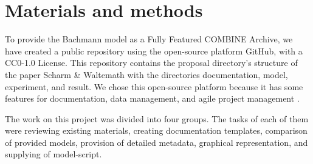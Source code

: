 \section*{Materials and methods}
To provide the Bachmann model \cite{bachmannmodel} as a Fully Featured COMBINE Archive, we have created a public repository using the open-source platform GitHub, with a CC0-1.0 License. This repository contains the proposal directory's structure of the paper Scharm \& Waltemath \cite{combine} with the directories documentation, model, experiment, and result. We chose this open-source platform because it has some features for documentation, data management, and agile project management \cite{github}.

The work on this project was divided into four groups. The tasks of each of them were reviewing existing materials, creating documentation templates, comparison of provided models, provision of detailed metadata, graphical representation, and supplying of model-script.